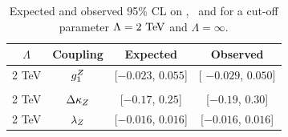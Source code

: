\begin{table}\centering 
\begin{tabular}{cccc}
\hline
 $\Lambda$ & Coupling & Expected  & Observed \\
\hline
2 TeV 	& $g_1^Z$ 		& [$-0.023$, $0.055$]  & [ $-0.029$, $0.050$] \\ \\
2 TeV 	& $\Delta \kappa_Z$ 	& [$-0.17$, $0.25$]    & [$-0.19$, $0.30$] \\
2 TeV 	& $\lambda_Z$ 	& [$-0.016$, $0.016$]  & [$-0.016$, $0.016$] \\
\hline
\end{tabular}
\caption{Expected and observed 95\% CL on \dkz, \lz\ and \gz\; for a cut-off parameter $\Lambda = 2\TeV$ and $\Lambda = \infty$.}
 \label{tab:sss-WZprod-ATGC}
\end{table}
 










